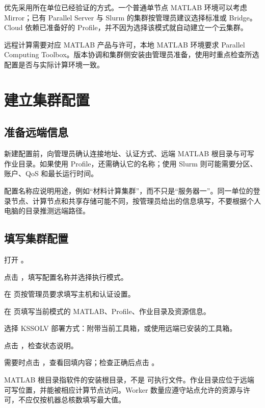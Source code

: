 优先采用所在单位已经验证的方式。一个普通单节点 MATLAB\regmark{} 环境可以考虑 Mirror；已有 Parallel Server 与 Slurm 的集群按管理员建议选择标准或 Bridge。Cloud 依赖已准备好的 Profile，并不因为选择该模式就自动建立一个云集群。

远程计算需要对应 MATLAB\regmark{} 产品与许可，本地 MATLAB\regmark{} 环境要求 Parallel Computing Toolbox。版本协调和集群侧安装由管理员准备，使用时重点检查所选配置是否与实际计算环境一致。

\section{建立集群配置}

\subsection{准备远端信息}

新建配置前，向管理员确认连接地址、认证方式、远端 MATLAB\regmark{} 根目录与可写作业目录。如果使用 Profile，还需确认它的名称；使用 Slurm 则可能需要分区、账户、QoS 和最长运行时间。

配置名称应说明用途，例如“材料计算集群”，而不只是“服务器一”。同一单位的登录节点、计算节点和共享存储可能不同，按管理员给出的信息填写，不要根据个人电脑的目录推测远端路径。

\subsection{填写集群配置}

\begin{steps}
\item 打开 。
\item 点击 ，填写配置名称并选择执行模式。
\item 在  页按管理员要求填写主机和认证设置。
\item 在  页填写当前模式的 MATLAB\regmark{}、Profile、作业目录及资源信息。
\item 选择 KSSOLV 部署方式：附带当前工具箱，或使用远端已安装的工具箱。
\item 点击 ，检查状态说明。
\item 需要时点击 ，查看回填内容；检查正确后点击 。
\end{steps}

MATLAB\regmark{} 根目录指软件的安装根目录，不是  可执行文件。作业目录应位于远端可写位置，并能被相应计算节点访问。Worker 数量应遵守站点允许的资源与许可，不应仅按机器总核数填写最大值。

